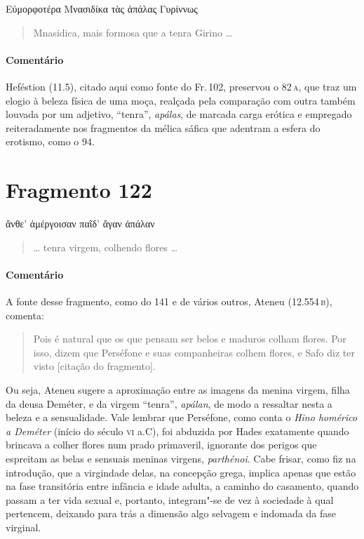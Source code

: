 \begin{gkverse}
Εὐμορφοτέρα Μνασιδίκα τὰς ἀπάλας Γυρίννως
\end{gkverse}

\begin{verse}
Mnasidica, mais formosa que a tenra Girino \ldots{}
\end{verse}

\medskip

{\paragraph{Comentário} Heféstion (11.5), citado aqui como fonte do Fr.\,102, preservou o 82\,\textsc{a}, que traz
um elogio à beleza física de uma moça, realçada pela comparação com outra
também louvada por um adjetivo, ``tenra'', \textit{apálas}, de marcada
carga erótica e empregado reiteradamente nos fragmentos da mélica sáfica que
adentram a esfera do erotismo, como o 94.}

\pagebreak
\section{Fragmento 122}

\begin{gkverse}
ἄνθε’ ἀμέργοισαν παῖδ’ ἄγαν ἀπάλαν
\end{gkverse}

\begin{verse}
\ldots{} tenra virgem, colhendo flores \ldots{}
\end{verse}

\medskip

{\paragraph{Comentário} A fonte desse fragmento, como do 141 e de vários outros, Ateneu (12.554\,\textsc{b}), comenta: 

\begin{quote}
Pois é natural
que os que pensam ser belos e maduros colham flores. Por isso, dizem que
Perséfone e suas companheiras colhem flores, e Safo diz ter visto 
[citação do fragmento].
\end{quote}

 Ou seja, Ateneu sugere a aproximação entre as imagens
da menina virgem, filha da deusa Deméter, e da virgem ``tenra'', \textit{apálan}, de modo a ressaltar nesta a beleza e a
sensualidade. Vale lembrar que Perséfone, como conta o \textit{Hino homérico a Deméter} 
(início do século \textsc{vi} a.C), foi abduzida por Hades exatamente
quando brincava a colher flores num prado primaveril, ignorante dos perigos que
espreitam as belas e sensuais meninas virgens, \textit{parthénoi}. Cabe frisar, como fiz na introdução, que a virgindade delas,
na concepção grega, implica
apenas que estão na fase transitória entre infância e idade
adulta, a caminho do casamento, quando passam a ter vida sexual e, portanto, integram"-se
de vez à sociedade à qual pertencem, deixando para trás a dimensão algo
selvagem e indomada da fase virginal.}



